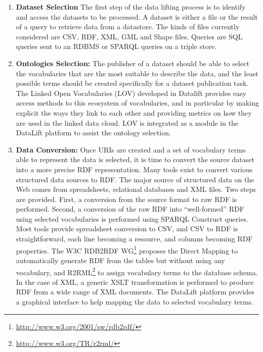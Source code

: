\begin{enumerate}

\item{\textbf{Dataset Selection}}
The first step of the data lifting process is to identify and access the datasets to be processed. A dataset is either a file or the result of a query to retrieve data from a datastore. The kinds of files currently considered are CSV, RDF, XML, GML and Shape files. Queries are SQL queries sent to an RDBMS or SPARQL queries on a triple store.

\item {\textbf{Ontologies Selection:}}
The publisher of a dataset should be able to select the vocabularies that are the most suitable to describe the data, and the least possible terms should be created specifically for a dataset publication task. The Linked Open Vocabularies \cite{lov11} (LOV) developed in Datalift provides easy access methods to this ecosystem of vocabularies, and in particular by making explicit the ways they link to each other and providing metrics on how they are used in the linked data cloud. LOV is integrated as a module in the DataLift platform to assist the ontology selection.

\item{\textbf{Data Conversion:}}
Once URIs are created and a set of vocabulary terms able to represent the data is selected, it is time to convert the source dataset into a more precise RDF representation. Many tools exist to convert various structured data sources to RDF. The major source of structured data on the Web comes from spreadsheets, relational databases and XML files. Two steps are provided. First, a conversion from the source format to raw RDF is performed. Second, a conversion of the raw RDF into ``well-formed'' RDF using selected vocabularies is performed using SPARQL Construct queries. Most tools provide spreadsheet conversion to CSV, and CSV to RDF is straightforward, each line becoming a resource, and columns becoming RDF properties. The W3C RDB2RDF WG\footnote{\url{http://www.w3.org/2001/sw/rdb2rdf/}} proposes the Direct Mapping to automatically generate RDF from the tables but without using any vocabulary, and R2RML\footnote{\url{http://www.w3.org/TR/r2rml/}}  to assign vocabulary terms to the database schema. In the case of XML, a generic XSLT transformation is performed to produce RDF from a wide range of XML documents. The DataLift platform provides a graphical interface to help mapping the data to selected vocabulary terms.


\end{enumerate}
